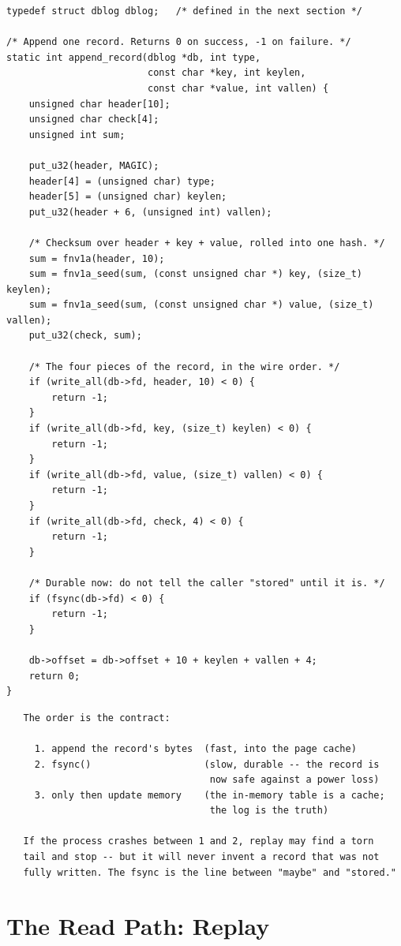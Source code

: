 \begin{lstlisting}[caption={append\_record: one durable record at the tail.}]
typedef struct dblog dblog;   /* defined in the next section */

/* Append one record. Returns 0 on success, -1 on failure. */
static int append_record(dblog *db, int type,
                         const char *key, int keylen,
                         const char *value, int vallen) {
    unsigned char header[10];
    unsigned char check[4];
    unsigned int sum;

    put_u32(header, MAGIC);
    header[4] = (unsigned char) type;
    header[5] = (unsigned char) keylen;
    put_u32(header + 6, (unsigned int) vallen);

    /* Checksum over header + key + value, rolled into one hash. */
    sum = fnv1a(header, 10);
    sum = fnv1a_seed(sum, (const unsigned char *) key, (size_t) keylen);
    sum = fnv1a_seed(sum, (const unsigned char *) value, (size_t) vallen);
    put_u32(check, sum);

    /* The four pieces of the record, in the wire order. */
    if (write_all(db->fd, header, 10) < 0) {
        return -1;
    }
    if (write_all(db->fd, key, (size_t) keylen) < 0) {
        return -1;
    }
    if (write_all(db->fd, value, (size_t) vallen) < 0) {
        return -1;
    }
    if (write_all(db->fd, check, 4) < 0) {
        return -1;
    }

    /* Durable now: do not tell the caller "stored" until it is. */
    if (fsync(db->fd) < 0) {
        return -1;
    }

    db->offset = db->offset + 10 + keylen + vallen + 4;
    return 0;
}
\end{lstlisting}

\begin{verbatim}
   The order is the contract:

     1. append the record's bytes  (fast, into the page cache)
     2. fsync()                    (slow, durable -- the record is
                                    now safe against a power loss)
     3. only then update memory    (the in-memory table is a cache;
                                    the log is the truth)

   If the process crashes between 1 and 2, replay may find a torn
   tail and stop -- but it will never invent a record that was not
   fully written. The fsync is the line between "maybe" and "stored."
\end{verbatim}

\section{The Read Path: Replay}

